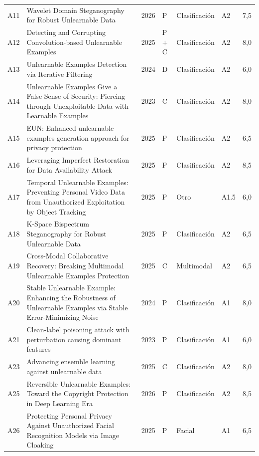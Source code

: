 \documentclass[pdflatex,sn-mathphys-num]{sn-jnl}
\theoremstyle{thmstyleone}
\theoremstyle{thmstyletwo}
\theoremstyle{thmstylethree}
\begin{document}
\begin{appendices}
\begin{longtable}{@{}cL{5.35cm}C{0.8cm}C{0.9cm}C{1.8cm}C{1.35cm}C{0.6cm}@{}}
A11 & Wavelet Domain Steganography for Robust Unlearnable Data~\cite{li2026wavelet} & 2026 & P & Clasificación & A2 & 7{,}5 \\
A12 & Detecting and Corrupting Convolution-based Unlearnable Examples~\cite{li2025coin} & 2025 & P$+$C & Clasificación & A2 & 8{,}0 \\
A13 & Unlearnable Examples Detection via Iterative Filtering~\cite{yu2024iterative} & 2024 & D & Clasificación & A2 & 6{,}0 \\
A14 & Unlearnable Examples Give a False Sense of Security: Piercing through Unexploitable Data with Learnable Examples~\cite{jiang2023false} & 2023 & C & Clasificación & A2 & 8{,}0 \\
A15 & EUN: Enhanced unlearnable examples generation approach for privacy protection~\cite{chen2025eun} & 2025 & P & Clasificación & A2 & 6{,}5 \\
A16 & Leveraging Imperfect Restoration for Data Availability Attack~\cite{huang2025imperfect} & 2025 & P & Clasificación & A2 & 8{,}5 \\
A17 & Temporal Unlearnable Examples: Preventing Personal Video Data from Unauthorized Exploitation by Object Tracking~\cite{wu2025temporal} & 2025 & P & Otro & A1.5 & 6{,}0 \\
A18 & K-Space Bispectrum Steganography for Robust Unlearnable Data~\cite{li2025kspace} & 2025 & P & Clasificación & A2 & 6{,}5 \\
A19 & Cross-Modal Collaborative Recovery: Breaking Multimodal Unlearnable Examples Protection~\cite{li2025crossmodal} & 2025 & C & Multimodal & A2 & 6{,}5 \\
A20 & Stable Unlearnable Example: Enhancing the Robustness of Unlearnable Examples via Stable Error-Minimizing Noise~\cite{liu2024stable} & 2024 & P & Clasificación & A1 & 8{,}0 \\
A21 & Clean-label poisoning attack with perturbation causing dominant features~\cite{zhang2023cleanlabel} & 2023 & P & Clasificación & A1 & 6{,}0 \\
A23 & Advancing ensemble learning against unlearnable data~\cite{hapuarachchi2025advancing} & 2025 & C & Clasificación & A2 & 8{,}0 \\
A25 & Reversible Unlearnable Examples: Toward the Copyright Protection in Deep Learning Era~\cite{wang2026reversible} & 2026 & P & Clasificación & A2 & 8{,}5 \\
A26 & Protecting Personal Privacy Against Unauthorized Facial Recognition Models via Image Cloaking~\cite{guo2025pyrfawkes} & 2025 & P & Facial & A1 & 6{,}5 \\

\end{longtable}
\end{appendices}
\end{document}
